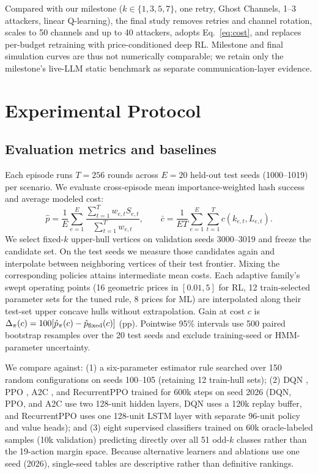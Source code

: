 \documentclass[10pt,twocolumn]{article}
\begin{document}
Compared with our milestone ($k\in\{1,3,5,7\}$, one retry, Ghost Channels, 1--3 attackers, linear Q-learning), the final study removes retries and channel rotation, scales to 50 channels and up to 40 attackers, adopts Eq.~\eqref{eq:cost}, and replaces per-budget retraining with price-conditioned deep RL. Milestone and final simulation curves are thus not numerically comparable; we retain only the milestone's live-LLM static benchmark as separate communication-layer evidence.

\section{Experimental Protocol}
\subsection{Evaluation metrics and baselines}
Each episode runs $T=256$ rounds across $E=20$ held-out test seeds (1000--1019) per scenario. We evaluate cross-episode mean importance-weighted hash success and average modeled cost:
\begin{equation}\label{eq:metric}
\hat p=\frac{1}{E}\sum_{e=1}^{E}\frac{\sum_{t=1}^{T}w_{e,t}S_{e,t}}{\sum_{t=1}^{T}w_{e,t}},\qquad
\bar c=\frac{1}{ET}\sum_{e=1}^{E}\sum_{t=1}^{T}c(k_{e,t},L_{e,t}).
\end{equation}
We select fixed-$k$ upper-hull vertices on validation seeds 3000--3019 and freeze the candidate set. On the test seeds we measure those candidates again and interpolate between neighboring vertices of their test frontier. Mixing the corresponding policies attains intermediate mean costs. Each adaptive family's swept operating points (16 geometric prices in $[0.01,5]$ for RL, 12 train-selected parameter sets for the tuned rule, 8 prices for ML) are interpolated along their test-set upper concave hulls without extrapolation. Gain at cost $c$ is $\Delta_\pi(c)=100[\hat p_\pi(c)-\hat p_{\rm fixed}(c)]$ (pp). Pointwise 95\% intervals use 500 paired bootstrap resamples over the 20 test seeds and exclude training-seed or HMM-parameter uncertainty.

We compare against: (1) a six-parameter estimator rule searched over 150 random configurations on seeds 100--105 (retaining 12 train-hull sets); (2) DQN \citep{mnih2015dqn}, PPO \citep{schulman2017ppo}, A2C \citep{mnih2016a3c}, and RecurrentPPO \citep{raffin2021sb3} trained for 600k steps on seed 2026 (DQN, PPO, and A2C use two 128-unit hidden layers, DQN uses a 120k replay buffer, and RecurrentPPO uses one 128-unit LSTM layer with separate 96-unit policy and value heads); and (3) eight supervised classifiers trained on 60k oracle-labeled samples (10k validation) predicting directly over all 51 odd-$k$ classes rather than the 19-action margin space. Because alternative learners and ablations use one seed (2026), single-seed tables are descriptive rather than definitive rankings.
\end{document}
